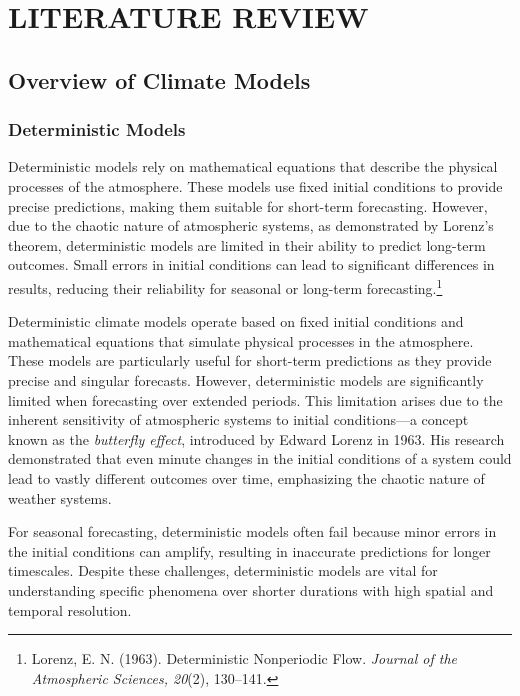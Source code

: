 \section{LITERATURE REVIEW}
\subsection{Overview of Climate Models}
\subsubsection{Deterministic Models}
Deterministic models rely on mathematical equations that describe the physical processes of the atmosphere. These models use fixed initial conditions to provide precise predictions, making them suitable for short-term forecasting. However, due to the chaotic nature of atmospheric systems, as demonstrated by Lorenz's theorem, deterministic models are limited in their ability to predict long-term outcomes. Small errors in initial conditions can lead to significant differences in results, reducing their reliability for seasonal or long-term forecasting.\footnote{Lorenz, E. N. (1963). Deterministic Nonperiodic 
Flow. \textit{Journal of the Atmospheric Sciences, 20}(2), 130–141.}

Deterministic climate models operate based on fixed initial conditions and mathematical equations that simulate physical processes in the atmosphere. These models are particularly useful for short-term predictions as they provide precise and singular forecasts. However, deterministic models are significantly limited when forecasting over extended periods. This limitation arises due to the inherent sensitivity of atmospheric systems to initial conditions—a concept known as the \textit{butterfly effect}, introduced by Edward Lorenz in 1963. His research demonstrated that even minute changes in the initial conditions of a system could lead to vastly different outcomes over time, emphasizing the chaotic nature of weather systems.

For seasonal forecasting, deterministic models often fail because minor errors in the initial conditions can amplify, resulting in inaccurate predictions for longer timescales. Despite these challenges, deterministic models are vital for understanding specific phenomena over shorter durations with high spatial and temporal resolution.

